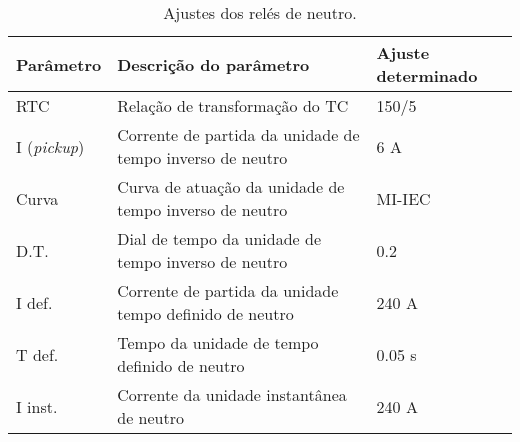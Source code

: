 \begin{table}[H]
\centering
\caption{Ajustes dos relés de neutro.}
\label{table:2}
\begin{adjustbox}{width=\columnwidth,center}
\begin{tabular}{|l|l|l|}
\hline
\textbf{Parâmetro} & \textbf{Descrição do parâmetro} & \textbf{Ajuste determinado} \\ \hline

RTC & Relação de transformação do TC & 150/5\\ \hline
I (\textit{pickup}) &  Corrente de partida da unidade de tempo inverso de neutro & 6 A\\ \hline
Curva & Curva de atuação da unidade de tempo inverso de neutro & MI-IEC\\ \hline
D.T. & Dial de tempo da unidade de tempo inverso de neutro & 0.2\\ \hline
I def. & Corrente de partida da unidade tempo definido de neutro & 240 A\\ \hline
T def. & Tempo da unidade de tempo definido de neutro & 0.05 s\\ \hline
I inst. & Corrente da unidade instantânea de neutro & 240 A\\ \hline
\end{tabular}
\end{adjustbox}
\end{table}